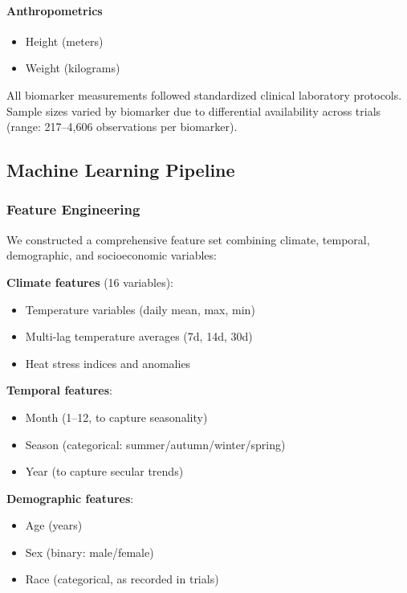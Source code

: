 \paragraph{Anthropometrics}
\begin{itemize}
    \item Height (meters)
    \item Weight (kilograms)
\end{itemize}

All biomarker measurements followed standardized clinical laboratory protocols. Sample sizes varied by biomarker due to differential availability across trials (range: 217--4,606 observations per biomarker).

\subsection{Machine Learning Pipeline}

\subsubsection{Feature Engineering}

We constructed a comprehensive feature set combining climate, temporal, demographic, and socioeconomic variables:

\textbf{Climate features} (16 variables):
\begin{itemize}
    \item Temperature variables (daily mean, max, min)
    \item Multi-lag temperature averages (7d, 14d, 30d)
    \item Heat stress indices and anomalies
\end{itemize}

\textbf{Temporal features}:
\begin{itemize}
    \item Month (1--12, to capture seasonality)
    \item Season (categorical: summer/autumn/winter/spring)
    \item Year (to capture secular trends)
\end{itemize}

\textbf{Demographic features}:
\begin{itemize}
    \item Age (years)
    \item Sex (binary: male/female)
    \item Race (categorical, as recorded in trials)
\end{itemize}

